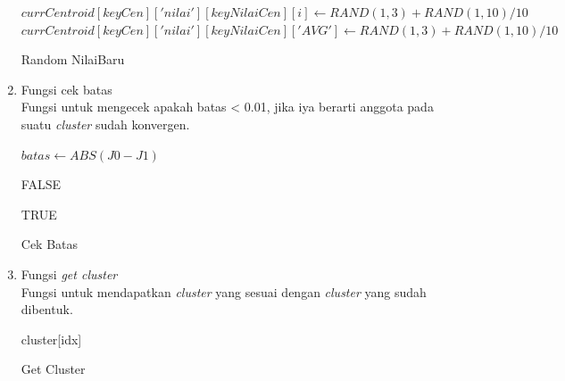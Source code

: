 \begin{enumerate}
        \begin{algorithm}[H]
            \begin{algorithmic}[1]
                        \State $currCentroid[keyCen]['nilai'][keyNilaiCen][i] \gets RAND(1,3) + RAND(1,10)/10$
                    \EndFor
                     \State $currCentroid[keyCen]['nilai'][keyNilaiCen]['AVG'] \gets RAND(1,3) + RAND(1,10)/10$
                \EndProcedure
            \end{algorithmic} 
            \caption{Random NilaiBaru}
            \label{alg:randomNilaiBaru}
        \end{algorithm}
    
    \item Fungsi cek batas \\
    
        Fungsi untuk mengecek apakah batas < 0.01, jika iya berarti anggota pada suatu \textit{cluster} sudah konvergen. \\
        
        \begin{algorithm}[H]
            \begin{algorithmic}[1]
                    \State $batas \gets ABS(J0 - J1)$
                    
                        \State \Return FALSE
                    \EndIf
                    
                    \State \Return TRUE
                \EndProcedure
            \end{algorithmic} 
            \caption{Cek Batas}
            \label{alg:cekBatas}
        \end{algorithm}
        
    \item Fungsi \textit{get cluster} \\
    
        Fungsi untuk mendapatkan \textit{cluster} yang sesuai dengan \textit{cluster} yang sudah dibentuk.\\
        
        \begin{algorithm}[H]
            \begin{algorithmic}[1]
                    \State \Return cluster[idx]
                \EndProcedure
            \end{algorithmic} 
            \caption{Get Cluster}
            \label{alg:getCluster}
        \end{algorithm}
    
\end{enumerate}

